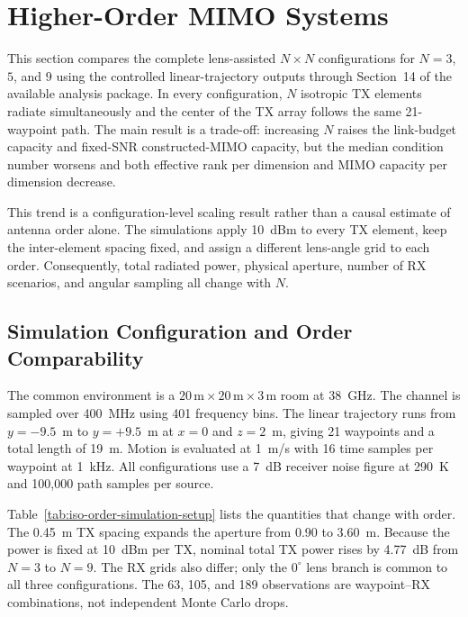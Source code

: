 \section{Higher-Order MIMO Systems}\label{sec:higher-order-mimo}

This section compares the complete lens-assisted $N\times N$ configurations for $N=3$, $5$, and $9$ using the controlled linear-trajectory outputs through Section~14 of the available analysis package. In every configuration, $N$ isotropic TX elements radiate simultaneously and the center of the TX array follows the same 21-waypoint path. The main result is a trade-off: increasing $N$ raises the link-budget capacity and fixed-SNR constructed-MIMO capacity, but the median condition number worsens and both effective rank per dimension and MIMO capacity per dimension decrease.

This trend is a configuration-level scaling result rather than a causal estimate of antenna order alone. The simulations apply 10~dBm to every TX element, keep the inter-element spacing fixed, and assign a different lens-angle grid to each order. Consequently, total radiated power, physical aperture, number of RX scenarios, and angular sampling all change with $N$.

\subsection{Simulation Configuration and Order Comparability}

The common environment is a $20\,\text{m}\times20\,\text{m}\times3\,\text{m}$ room at 38~GHz. The channel is sampled over 400~MHz using 401 frequency bins. The linear trajectory runs from $y=-9.5$~m to $y=+9.5$~m at $x=0$ and $z=2$~m, giving 21 waypoints and a total length of 19~m. Motion is evaluated at 1~m/s with 16 time samples per waypoint at 1~kHz. All configurations use a 7~dB receiver noise figure at 290~K and 100{,}000 path samples per source.

Table~\ref{tab:iso-order-simulation-setup} lists the quantities that change with order. The 0.45~m TX spacing expands the aperture from 0.90 to 3.60~m. Because the power is fixed at 10~dBm per TX, nominal total TX power rises by 4.77~dB from $N=3$ to $N=9$. The RX grids also differ; only the $0^\circ$ lens branch is common to all three configurations. The 63, 105, and 189 observations are waypoint--RX combinations, not independent Monte Carlo drops.

